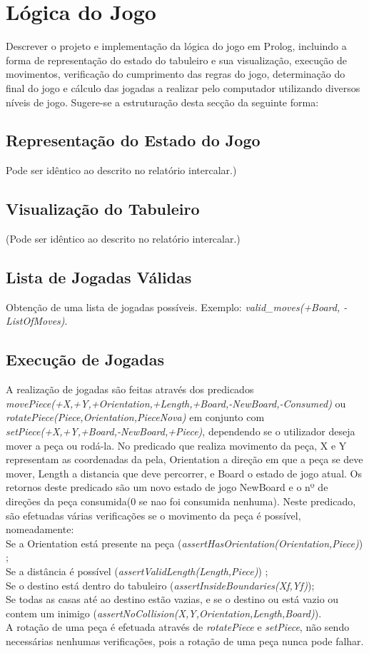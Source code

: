 \documentclass[a4paper]{article}
\begin{document}
\section{Lógica do Jogo}

Descrever o projeto e implementação da lógica do jogo em Prolog, incluindo a forma de representação do estado do tabuleiro e sua visualização, execução de movimentos, verificação do cumprimento das regras do jogo, determinação do final do jogo e cálculo das jogadas a realizar pelo computador utilizando diversos níveis de jogo. Sugere-se a estruturação desta secção da seguinte forma:

\subsection{Representação do Estado do Jogo} Pode ser idêntico ao descrito no relatório intercalar.)

\subsection{Visualização do Tabuleiro} (Pode ser idêntico ao descrito no relatório intercalar.)

\subsection{Lista de Jogadas Válidas} Obtenção de uma lista de jogadas possíveis. Exemplo: \textit{valid\_moves(+Board, -ListOfMoves)}.

\subsection{Execução de Jogadas} A realização de jogadas são feitas através dos predicados \textit{movePiece(+X,+Y,+Orientation,+Length,+Board,-NewBoard,-Consumed)} ou \textit{rotatePiece(Piece,Orientation,PieceNova)} em conjunto com \textit{setPiece(+X,+Y,+Board,-NewBoard,+Piece)}, dependendo se o utilizador deseja mover a peça ou rodá-la.
No predicado que realiza movimento da peça, X e Y representam as coordenadas da pela, Orientation a direção em que a peça se deve mover, Length a distancia que deve percorrer, e Board o estado de jogo atual.
Os retornos deste predicado são um novo estado de jogo NewBoard e o nº de direções da peça consumida(0 se nao foi consumida nenhuma).
Neste predicado, são efetuadas várias verificações se o movimento da peça é possível, nomeadamente:\\Se a Orientation está presente na peça (\textit{assertHasOrientation(Orientation,Piece)}) ;\\Se a distância é possível (\textit{assertValidLength(Length,Piece)}) ;\\Se o destino está dentro do tabuleiro (\textit{assertInsideBoundaries(Xf,Yf)});\\Se todas as casas até ao destino estão vazias, e se o destino ou está vazio ou contem um inimigo (\textit{assertNoCollision(X,Y,Orientation,Length,Board)}).\\
A rotação de uma peça é efetuada através de \textit{rotatePiece} e \textit{setPiece}, não sendo necessárias nenhumas verificações, pois a rotação de uma peça nunca pode falhar.
\end{document}
